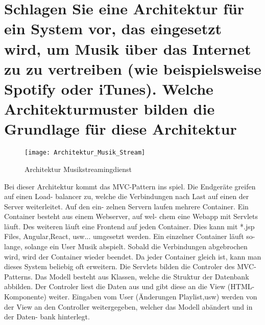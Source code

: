 \documentclass[12pt]{article}
\begin{document}
\section{Schlagen Sie eine Architektur für ein System vor, das eingesetzt wird, um Musik über das Internet zu zu
vertreiben (wie beispielsweise Spotify oder iTunes). Welche Architekturmuster bilden die Grundlage für
diese Architektur}
\begin{figure}[h]
\begin{center}
\texttt{[image: Architektur\_Musik\_Stream]}
\caption{Architektur Musikstreamingdienst}
\end{center}
\end{figure}
Bei dieser Architektur kommt das MVC-Pattern ins spiel. Die Endgeräte greifen auf einen Load- balancer zu, welche die Verbindungen nach Last auf einen der Server weiterleitet. Auf den ein- zelnen Servern laufen mehrere Container. Ein Container besteht aus einem Webserver, auf wel- chem eine Webapp mit Servlets läuft. Des weiteren läuft eine Frontend auf jeden Container. Dies kann mit *.jsp Files, Angular,React, usw... umgesetzt werden. Ein einzelner Container läuft so- lange, solange ein User Musik abspielt. Sobald die Verbindungen abgebrochen wird, wird der Container wieder beendet. Da jeder Container gleich ist, kann man dieses System beliebig oft erweitern. Die Servlets bilden die Controler des MVC-Patterns. Das Modell besteht aus Klassen, welche die Struktur der Datenbank abbilden. Der Controler liest die Daten aus und gibt diese an die View (HTML-Komponente) weiter. Eingaben vom User (Änderungen Playlist,usw) werden von der View an den Controller weitergegeben, welcher das Modell abändert und in der Daten- bank hinterlegt.
\end{document}
